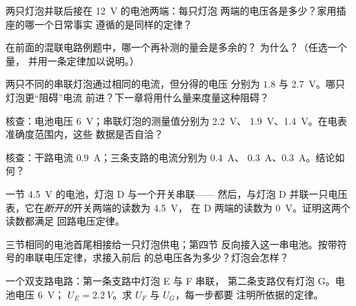 \begin{exercise}[$\star$]\label{exo:g8:circuit-laws:4}
两只灯泡并联后接在 \qty{12}{V} 的电池两端：每只灯泡
两端的电压各是多少？家用插座的哪一个日常事实
遵循的是同样的定律？
\end{exercise}

\begin{exercise}[$\star$]\label{exo:g8:circuit-laws:5}
在前面的混联电路例题中，哪一个再补测的量会是多余的？
为什么？（任选一个量，
并用一条定律加以说明。）
\end{exercise}

\begin{exercise}[$\star$]\label{exo:g8:circuit-laws:6}
两只不同的串联灯泡通过相同的电流，但分得的电压
分别为 $1.8$ 与 \qty{2.7}{V}。哪只灯泡更“阻碍”电流
前进？下一章将用什么量来度量这种阻碍？
\end{exercise}

\begin{exercise}[$\star$]\label{exo:g8:circuit-laws:7}
核查：电池电压 \qty{6}{V}；串联灯泡的测量值分别为 \qty{2.2}{V}、
\qty{1.9}{V}、\qty{1.4}{V}。在电表准确度范围内，这些
数据是否自洽？
\end{exercise}

\begin{exercise}[$\star$]\label{exo:g8:circuit-laws:8}
核查：干路电流 \qty{0.9}{A}；三条支路的电流分别为 \qty{0.4}{A}、
\qty{0.3}{A}、\qty{0.3}{A}。结论如何？
\end{exercise}

\begin{exercise}[$\star\star$]\label{exo:g8:circuit-laws:9}
一节 \qty{4.5}{V} 的电池，灯泡 D 与一个开关串联——
然后，与灯泡 D 并联一只电压表，它在\emph{断开的}开关两端的读数为 \qty{4.5}{V}，
在 D 两端的读数为 \qty{0}{V}。证明这两个读数都满足
回路电压定律。
\end{exercise}

\begin{exercise}[$\star\star$]\label{exo:g8:circuit-laws:10}
三节相同的电池首尾相接给一只灯泡供电；第四节
反向接入这一串电池。按带符号的串联电压定律，求接入前后
的总电压各为多少？灯泡会怎样？
\end{exercise}

\begin{exercise}[$\star\star$]\label{exo:g8:circuit-laws:11}
一个双支路电路：第一条支路中灯泡 E 与 F 串联，
第二条支路仅有灯泡 G。电池电压 \qty{6}{V}；
$U_E = \qty{2.2}{V}$。求 $U_F$ 与 $U_G$，每一步都要
注明所依据的定律。
\end{exercise}


